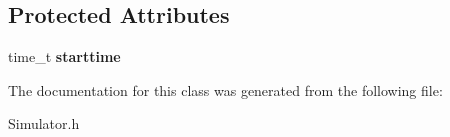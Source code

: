 \subsection*{Protected Attributes}
\begin{DoxyCompactItemize}
\item 
\hypertarget{classSimulator_a1a287cb00e5388a7866b5e4f5a35a137}{}time\+\_\+t {\bfseries starttime}\label{classSimulator_a1a287cb00e5388a7866b5e4f5a35a137}

\end{DoxyCompactItemize}


The documentation for this class was generated from the following file\+:\begin{DoxyCompactItemize}
\item 
Simulator.\+h\end{DoxyCompactItemize}

